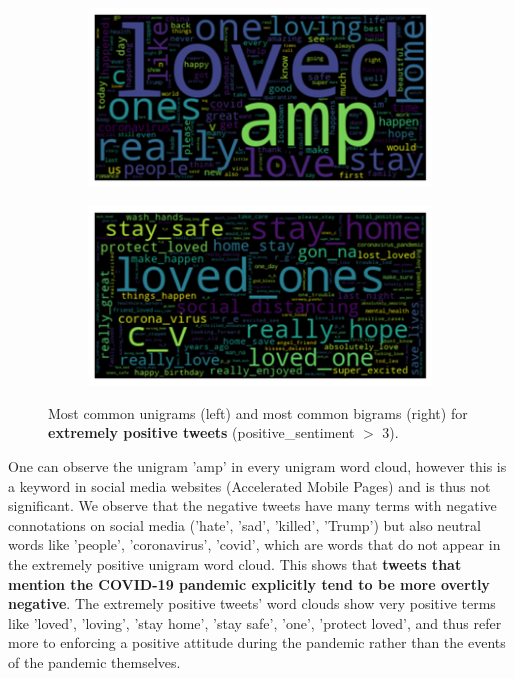 \begin{figure}
    \centering
    \begin{subfigure}{0.49\columnwidth}
        \includegraphics[width=1\textwidth]{images/uni_pos.png}
    \end{subfigure}
    \centering
    \begin{subfigure}{0.49\columnwidth}
        \includegraphics[width=1\textwidth]{images/bi_pos.png}
    \end{subfigure}
    \caption{Most common unigrams (left) and most common bigrams (right) for \textbf{extremely positive tweets} (positive\_sentiment $>$ 3).}
    \label{fig:uni_bi_pos}
\end{figure}

One can observe the unigram 'amp' in every unigram word cloud, however this is a keyword in social media websites (Accelerated Mobile Pages) and is thus not significant. We observe that the negative tweets have many terms with negative connotations on social media ('hate', 'sad', 'killed', 'Trump') but also neutral words like 'people', 'coronavirus', 'covid', which are words that do not appear in the extremely positive unigram word cloud. This shows that \textbf{tweets that mention the COVID-19 pandemic explicitly tend to be more overtly negative}. The extremely positive tweets' word clouds show very positive terms like 'loved', 'loving', 'stay home', 'stay safe', 'one', 'protect loved', and thus refer more to enforcing a positive attitude during the pandemic rather than the events of the pandemic themselves. 

